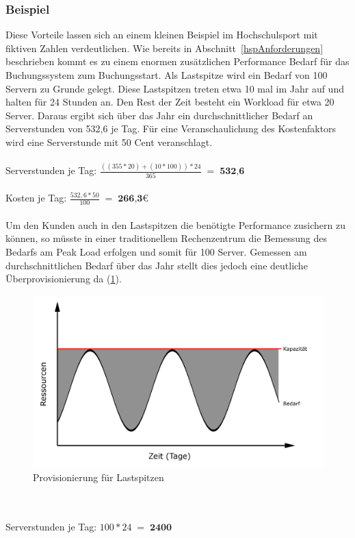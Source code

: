 \subsubsection{Beispiel}
Diese Vorteile lassen sich an einem kleinen Beispiel im Hochschulsport mit fiktiven Zahlen verdeutlichen. Wie bereits in Abschnitt~\ref{hspAnforderungen} beschrieben kommt es zu einem enormen zusätzlichen Performance Bedarf für das Buchungssystem zum Buchungsstart. Als Lastspitze wird ein Bedarf von 100 Servern zu Grunde gelegt. Diese Lastspitzen treten etwa 10 mal im Jahr auf und halten für 24 Stunden an. Den Rest der Zeit besteht ein Workload für etwa 20 Server. Daraus ergibt sich über das Jahr ein durchschnittlicher Bedarf an Serverstunden von 532,6 je Tag. Für eine Veranschaulichung des Kostenfaktors wird eine Serverstunde mit 50 Cent veranschlagt.
\\
\\
Serverstunden je Tag:    $\displaystyle \frac{((355 * 20) + (10 * 100)) * 24}{365}\; =\; \textbf{532,6}	 $\\
\\
Kosten je Tag:           $\displaystyle \frac{532,6 * 50}{100}\; =\; \textbf{266,3€} $\\
\\
Um den Kunden auch in den Lastspitzen die benötigte Performance zusichern zu können, so müsste in einer traditionellem Rechenzentrum die Bemessung des Bedarfs am Peak Load erfolgen und somit für 100 Server. Gemessen am durchschnittlichen Bedarf über das Jahr stellt dies jedoch eine deutliche Überprovisionierung da (\ref{fig:overprovisioning}).
	\begin{figure}[h]
		\centering
		\includegraphics[width=0.7\linewidth]{images/overprovisioning}
		\caption{Provisionierung für Lastspitzen}
		\label{fig:overprovisioning}
	\end{figure}
\\ 
\\
Serverstunden je Tag:    $\displaystyle 100 * 24 \; =\; \textbf{2400} $\\
